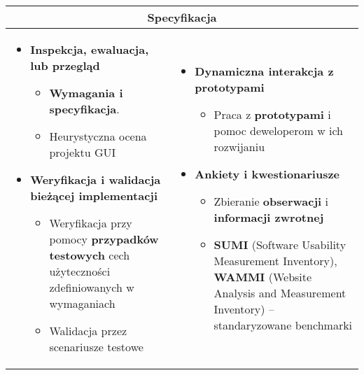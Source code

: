 \documentclass[../main.tex]{subfiles}
\begin{document}
    \begin{table}[H]
        \begin{center}
            \begin{tabular}{| p{8cm} | p{8cm} |}
                \hline
                \multicolumn{2}{|c|}{\textbf{Specyfikacja}}\\
                \hline
                \begin{itemize}
                    \item \textbf{Inspekcja, ewaluacja, lub przegląd}
                    \begin{itemize}
                        \item \textbf{Wymagania i specyfikacja}.
                        \item Heurystyczna ocena projektu GUI
                    \end{itemize}

                    \item \textbf{Weryfikacja i walidacja bieżącej implementacji}
                    \begin{itemize}
                        \item Weryfikacja przy pomocy \textbf{przypadków testowych} cech użyteczności
                        zdefiniowanych w wymaganiach
                        \item Walidacja przez scenariusze testowe
                    \end{itemize}
                \end{itemize}
                &
                \begin{itemize}
                    \item \textbf{Dynamiczna interakcja z prototypami}
                    \begin{itemize}
                        \item Praca z \textbf{prototypami} i pomoc deweloperom w ich rozwijaniu
                    \end{itemize}

                    \item \textbf{Ankiety i kwestionariusze}
                    \begin{itemize}
                        \item Zbieranie \textbf{obserwacji} i \textbf{informacji zwrotnej}
                        \item \textbf{SUMI} (Software Usability Measurement Inventory), \textbf{WAMMI} (Website Analysis and Measurement Inventory)
                        – standaryzowane benchmarki
                    \end{itemize}
                \end{itemize}\\
                \hline
            \end{tabular}
        \end{center}
    \end{table}
\end{document}

